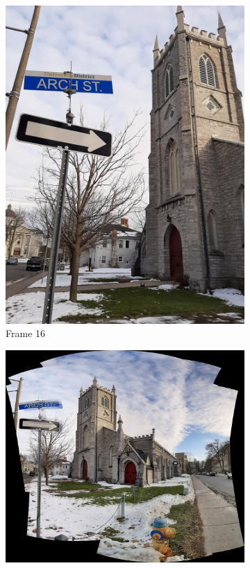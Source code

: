 \documentclass[conference]{IEEEtran}
\begin{document}
\begin{figure}[!h]
\begin{subfigure}[b]{0.2\linewidth}
    \includegraphics[width=\linewidth, angle = -90]{images/frame16.jpg}
    \caption{Frame 16}
  \end{subfigure}
  \begin{subfigure}[b]{0.4\linewidth}
    \includegraphics[width=\linewidth]{images/result.jpg}

\end{subfigure}
\end{figure}
\end{document}
